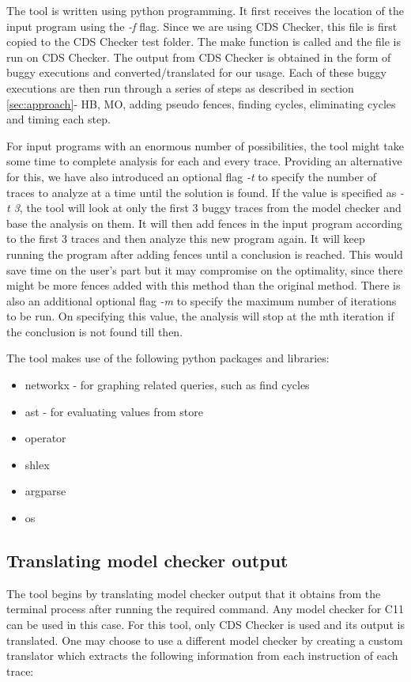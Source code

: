 \par
The tool is written using python programming. It first receives the location of the input program using the \textit{-f} flag. Since we are using CDS Checker, this file is first copied to the CDS Checker test folder. The make function is called and the file is run on CDS Checker. The output from CDS Checker is obtained in the form of buggy executions and converted/translated for our usage. Each of these buggy executions are then run through a series of steps as described in section \ref{sec:approach}- HB, MO, adding pseudo fences, finding cycles, eliminating cycles and timing each step.

For input programs with an enormous number of possibilities, the tool might take some time to complete analysis for each and every trace. Providing an alternative for this, we have also introduced an optional flag \textit{-t} to specify the number of traces to analyze at a time until the solution is found. If the value is specified as \textit{-t 3}, the tool will look at only the first 3 buggy traces from the model checker and base the analysis on them. It will then add fences in the input program according to the first 3 traces and then analyze this new program again. It will keep running the program after adding fences until a conclusion is reached. This would save time on the user's part but it may compromise on the optimality, since there might be more fences added with this method than the original method. There is also an additional optional flag \textit{-m} to specify the maximum number of iterations to be run. On specifying this value, the analysis will stop at the mth iteration if the conclusion is not found till then.

The tool makes use of the following python packages and libraries:
\begin{itemize}
	\item networkx - for graphing related queries, such as find cycles
	\item ast - for evaluating values from store
	\item operator
	\item shlex
	\item argparse
	\item os
\end{itemize}

\subsection{Translating model checker output}
The tool begins by translating model checker output that it obtains from the terminal process after running the required command. Any model checker for C11 can be used in this case. For this tool, only CDS Checker is used and its output is translated. One may choose to use a different model checker by creating a custom translator which extracts the following information from each instruction of each trace:

